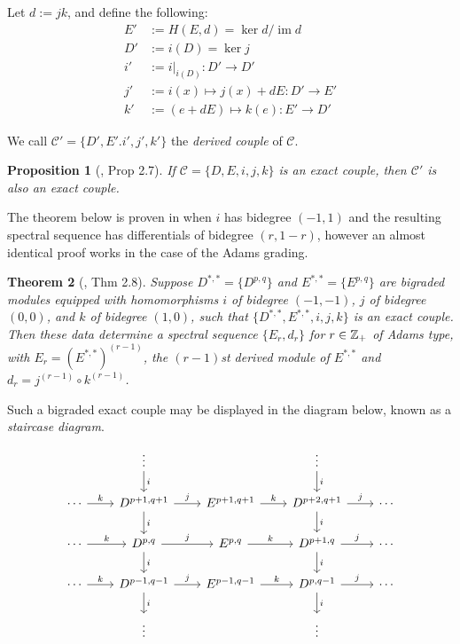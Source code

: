 \documentclass[11pt, titlepage]{article} %
\def\inte{\ensuremath\mathbb{Z}}
\DeclareMathOperator{\im}{im}
\numberwithin{equation}{subsection}
\theoremstyle{plain}
\newtheorem{theorem}{Theorem}[subsection]
\newtheorem{proposition}[theorem]{Proposition}
\theoremstyle{definition}
\begin{document}
Let \(d:=jk\), and define the following:
\begin{align*}
E'&:=H(E, d)=\ker d/\im d\\
D'&:=i(D)=\ker j\\
i'&:=i|_{i(D)} : D'\to D'\\
j'&:=i(x)\mapsto j(x)+dE : D'\to E'\\
k'&:=(e+dE)\mapsto k(e) : E' \to D'
\end{align*}

We call \(\mathcal{C}'=\{D', E'. i', j', k'\}\) the \textit{derived couple} of \(\mathcal{C}\). 

\begin{proposition}[\autocite{spectral_sequences}, Prop 2.7]
If \(\mathcal{C}=\{D, E, i, j, k\}\) is an exact couple, then \(\mathcal{C}'\) is also an exact couple.
\end{proposition}

The theorem below is proven in \autocite{spectral_sequences} when \(i\) has bidegree \((-1, 1)\) and the resulting spectral sequence has differentials of bidegree \((r, 1-r)\), however an almost identical proof works in the case of the Adams grading. 

\begin{theorem}[{\autocite{spectral_sequences}, Thm 2.8}]\label{2503301131}
Suppose \(D^{*,*}=\{D^{p,q}\}\) and \(E^{*,*}=\{E^{p,q}\}\) are bigraded modules equipped with homomorphisms \(i\) of bidegree \((-1,-1)\), \(j\) of bidegree \((0,0)\), and \(k\) of bidegree \((1,0)\), such that \(\{D^{*,*}, E^{*,*}, i, j, k\}\) is an exact couple. Then these data determine a spectral sequence \(\{E_r, d_r\}\) for \(r\in \inte_+\) of Adams type, with \(E_r=(E^{*,*})^{(r-1)}\), the \((r-1)\)st derived module of \(E^{*,*}\) and \(d_r=j^{(r-1)}\circ k^{(r-1)}\).
\end{theorem}

Such a bigraded exact couple may be displayed in the diagram below, known as a \textit{staircase diagram}.
\[\begin{tikzcd}[row sep=4ex, column sep=5ex]
   &  \vdots \arrow[d, "i"] &  & \vdots \arrow[d, "i"] & \\
 \cdots \arrow[r, "k"] & D^{p+1, q+1} \arrow[d, "i"] \arrow[r, "j"] & E^{p+1,q+1}  \arrow[r, "k"] & D^{p+2,q+1} \arrow[d, "i"] \arrow[r, "j"] & \cdots \\
 \cdots \arrow[r, "k"] & D^{p,q} \arrow[d, "i"] \arrow[r, "j"] & E^{p,q}  \arrow[r, "k"] & D^{p+1,q} \arrow[d, "i"] \arrow[r, "j"] & \cdots \\
 \cdots \arrow[r, "k"] & D^{p-1,q-1}  \arrow[d, "i"] \arrow[r, "j"] & E^{p-1,q-1}  \arrow[r, "k"] & D^{p,q-1} \arrow[d, "i"] \arrow[r, "j"] & \cdots \\
 & \vdots &  & \vdots & 
\end{tikzcd}\]
\end{document}
